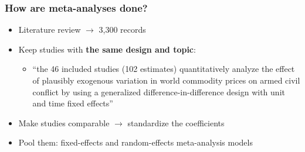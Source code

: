 \begin{frame}
\frametitle{How are meta-analyses done?}
\centering

\begin{itemize}
  \item[1.] Literature review $\rightarrow$ 3,300 records
  \vspace{6pt}
  \item<2->[2.] Keep studies with \textbf{the same design and topic}:
  \begin{itemize}
    \item[] {\footnotesize ``the 46 included studies (102 estimates) quantitatively analyze the effect of plausibly exogenous variation in world commodity prices on armed civil conflict by using a generalized difference-in-difference design with unit and time fixed effects''}
  \end{itemize}
  \vspace{6pt}
  \item<3->[3.] Make studies comparable $\rightarrow$ standardize the coefficients
  \vspace{6pt}
  \item<4->[4.] Pool them: fixed-effects and random-effects meta-analysis models
\end{itemize}

\end{frame}

